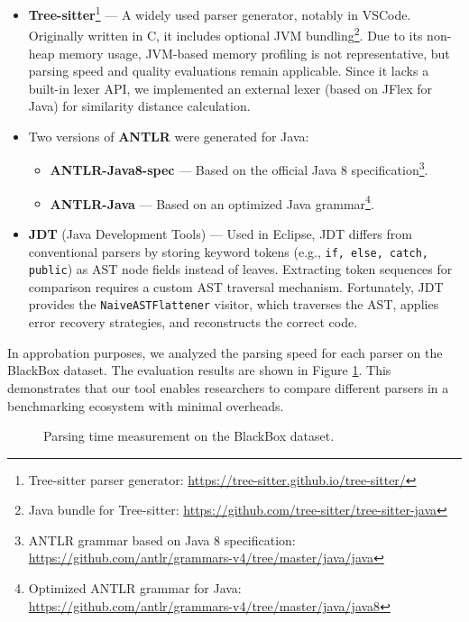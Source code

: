 \documentclass[conference]{IEEEtran}
\begin{document}
\begin{itemize}
    \item \textbf{Tree-sitter}\footnote{Tree-sitter parser generator: \url{https://tree-sitter.github.io/tree-sitter/}} --- A widely used parser generator, notably in VSCode. Originally written in C, it includes optional JVM bundling\footnote{Java bundle for Tree-sitter: \url{https://github.com/tree-sitter/tree-sitter-java}}.  Due to its non-heap memory usage, JVM-based memory profiling is not representative, but parsing speed and quality evaluations remain applicable. Since it lacks a built-in lexer API, we implemented an external lexer (based on JFlex for Java) for similarity distance calculation.

    \item Two versions of \textbf{ANTLR}\cite{all-star} were generated for Java:
    \begin{itemize}
        \item \textbf{ANTLR-Java8-spec} --- Based on the official Java 8 specification\footnote{ANTLR grammar based on Java 8 specification:\\ \url{https://github.com/antlr/grammars-v4/tree/master/java/java}}.
        \item \textbf{ANTLR-Java} --- Based on an optimized Java grammar\footnote{Optimized ANTLR grammar for Java:\\ \url{https://github.com/antlr/grammars-v4/tree/master/java/java8}}.
    \end{itemize}  
 

    \item \textbf{JDT} (Java Development Tools) --- Used in Eclipse, JDT differs from conventional parsers by storing keyword tokens (e.g., \texttt{if, else, catch, public}) as AST node fields instead of leaves. Extracting token sequences for comparison requires a custom AST traversal mechanism. Fortunately, JDT provides the \texttt{NaiveASTFlattener} visitor, which traverses the AST, applies error recovery strategies, and reconstructs the correct code.
\end{itemize}


In approbation purposes, we analyzed the parsing speed for each parser on the BlackBox dataset. The evaluation results are shown in Figure \ref{fig:fig-speed}. This demonstrates that our tool enables researchers to compare different parsers in a benchmarking ecosystem with minimal overheads.

\begin{figure}[htbp]

\caption{Parsing time measurement on the BlackBox dataset.}
\label{fig:fig-speed}
\end{figure}
\end{document}
